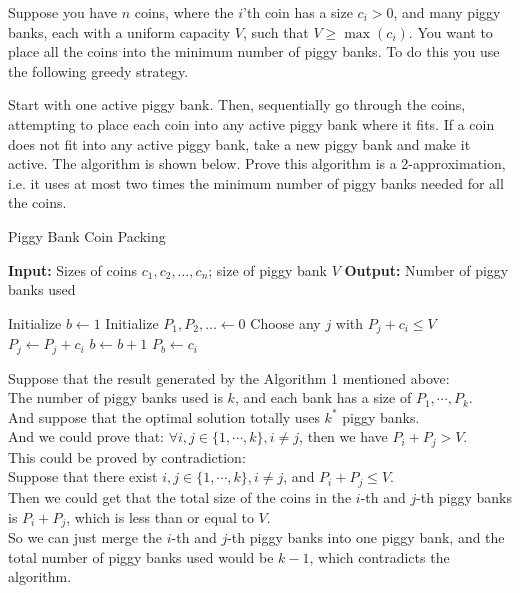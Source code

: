 \problem{}
Suppose you have $n$ coins, where the $i$'th coin has a size $c_i > 0$, and many piggy banks, each with a uniform capacity \(V\), such that \(V \geq \max(c_i)\).  You want to place all the coins into the minimum number of piggy banks.  To do this you use the following greedy strategy.

Start with one active piggy bank.  Then, sequentially go through the coins, attempting to place each coin into any active piggy bank where it fits. If a coin does not fit into any active piggy bank, take a new piggy bank and make it active.  The algorithm is shown below.  Prove this algorithm is a 2-approximation, i.e. it uses at most two times the minimum number of piggy banks needed for all the coins.

\begin{algorithm}
\caption{Piggy Bank Coin Packing}
\begin{algorithmic}[1]
\label{alg:piggy}
\State \textbf{Input:} Sizes of coins \(c_1, c_2, \ldots, c_n\); size of piggy bank \(V\)
\State \textbf{Output:} Number of piggy banks used

\State Initialize \(b \leftarrow 1\) 
\State Initialize \(P_1, P_2, \ldots \leftarrow 0\) 
        \State Choose any \(j\) with \(P_j + c_i \leq V\)
        \State \(P_j \leftarrow P_j + c_i\) 
    \Else
        \State \(b \leftarrow b + 1\)
        \State \(P_b \leftarrow c_i\) 
    \EndIf
\EndFor
\end{algorithmic}
\end{algorithm}

\solution{}

Suppose that the result generated by the Algorithm 1 mentioned above: \\
The number of piggy banks used is $k$, and each bank has a size of $P_1,\cdots,P_k$.\\
And suppose that the optimal solution totally uses $k^*$ piggy banks.\\

And we could prove that: $\forall i,j\in \{1,\cdots,k\}, i\neq j$, then we have $P_i+P_j > V$.\\
This could be proved by contradiction:\\
Suppose that there exist $i,j\in \{1,\cdots,k\}, i\neq j$, and $P_i+P_j \leq V$.\\
Then we could get that the total size of the coins in the $i$-th and $j$-th piggy banks is $P_i+P_j$, which is less than or equal to $V$.\\
So we can just merge the $i$-th and $j$-th piggy banks into one piggy bank, and the total number of piggy banks used would be $k-1$, which contradicts the algorithm.\\


